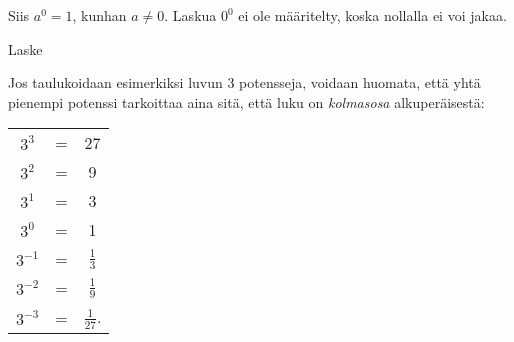 Siis $a^0=1$, kunhan $a\neq 0$.  Laskua $0^0$ ei ole määritelty, koska
nollalla ei voi jakaa. 
 
  

    \begin{esimerkki}
        Laske
        \begin{alakohdat}
         \end{alakohdat}
    \end{esimerkki}

Jos taulukoidaan esimerkiksi luvun 3 potensseja, voidaan huomata, että
yhtä pienempi potenssi tarkoittaa aina sitä, että luku on \emph{kolmasosa}
alkuperäisestä:
   
\begin{tabular}{c c c}
$3^3$ & = & 27 \\
$3^2$ & = & 9 \\
$3^1$ & = & 3 \\
$3^0$ & = & 1 \\
$3^{-1}$ & = & $\frac{1}{3}$ \\
$3^{-2}$ & = & $\frac{1}{9}$ \\
$3^{-3}$ & = & $\frac{1}{27}$.
\end{tabular}
